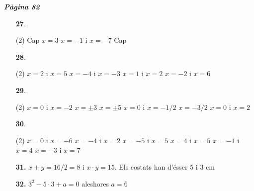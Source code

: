 \documentclass[a4paper, pdf, twoside]{book}
\begin{document}
\begin{multicols}{2}

{\textbf{\em Pàgina 82}} \hrulefill
\begin{enumerate}
\vspace{0.25cm}



 \item[\fontfamily{phv}\selectfont\color{blue}\textbf{27}. ] 
 \begin{tasks}[column-sep=1em, item-indent=1.3333em](2)
	 \task Cap
	 \task $x=3$
	 \task $x=-1$ i $x=-7$
	 \task Cap
\end{tasks}
 \end{enumerate}
\begin{enumerate}
\vspace{0.25cm}



 \item[\fontfamily{phv}\selectfont\color{blue}\textbf{28}. ] 
 \begin{tasks}[column-sep=1em, item-indent=1.3333em](2)
	 \task $x=2$ i $x=5$
	 \task $x=-4$ i $x=-3$
	 \task $x=1$ i $x=2$
	 \task $x=-2$ i $x=6$
\end{tasks}
\vspace{0.25cm}



 \item[\fontfamily{phv}\selectfont\color{blue}\textbf{29}. ]  \scalebox{0.6}{\simbolclau } 
 \begin{tasks}[column-sep=1em, item-indent=1.3333em](2)
	 \task $x=0$ i $x=-2$
	 \task $x=\pm 3$
	 \task $x=\pm 5$
	 \task $x=0$ i $x=-1/2$
	 \task $x=-3/2$
	 \task $x=0$ i $x=2$
\end{tasks}
\vspace{0.25cm}



 \item[\fontfamily{phv}\selectfont\color{blue}\textbf{30}. ] 
 \begin{tasks}[column-sep=1em, item-indent=1.3333em](2)
	 \task $x=0$ i $x=-6$
	 \task $x=-4$ i $x=2$
	 \task $x=-5$ i $x=5$
	 \task $x=4$ i $x=5$
	 \task $x=-1$ i $x=4$
	 \task $x=-3$ i $x=7$
\end{tasks}
\vspace{0.25cm}
\item[\fontfamily{phv}\selectfont\color{blue}\textbf{31. }] 
$x+y=16/2=8$ i $x\cdot y =15$. Els costats han d'ésser 5 i 3 cm
\vspace{0.25cm}
\item[\fontfamily{phv}\selectfont\color{blue}\textbf{32. }] 
${3}^{2}- 5\cdot 3 + a= 0$ aleshores $a=6$
 \end{enumerate}
\vspace{0.3cm}


\end{multicols}
\end{document}
